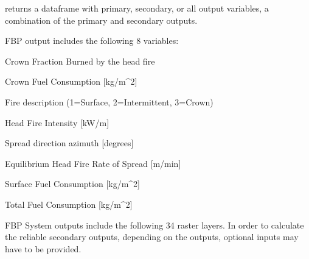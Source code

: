 \documentclass[a4paper]{book}
\begin{document}
%
\begin{Value}
 returns a dataframe with primary, secondary, or all
output variables, a combination of the primary and secondary outputs.

 FBP output includes the following 8 variables: 

\begin{ldescription}
\item[\code{CFB}] Crown Fraction Burned by the head fire
\item[\code{CFC}] Crown Fuel Consumption [kg/m\textasciicircum{}2]
\item[\code{FD}] Fire description (1=Surface, 2=Intermittent, 3=Crown)
\item[\code{HFI}] Head Fire Intensity [kW/m]
\item[\code{RAZ}] Spread direction azimuth [degrees]
\item[\code{ROS}] Equilibrium Head Fire Rate of Spread [m/min]
\item[\code{SFC}] Surface Fuel Consumption [kg/m\textasciicircum{}2]
\item[\code{TFC}] Total Fuel Consumption [kg/m\textasciicircum{}2]

\end{ldescription}
 FBP System outputs include the following 34 raster layers. In order
to calculate the reliable secondary outputs, depending on the outputs, 
optional inputs may have to be provided.  


\end{Value}
\end{document}
